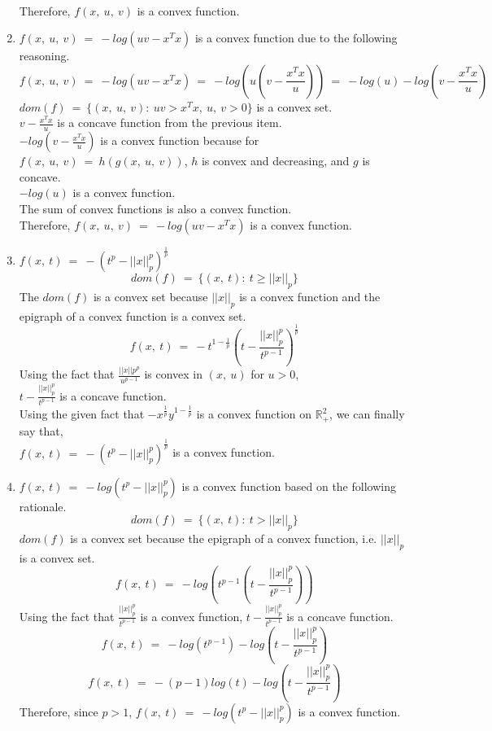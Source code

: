 \documentclass[12pt, draftcls, onecolumn]{IEEEtran}
\begin{document}
\begin{enumerate}
    \\Therefore, $f(x,\ u,\ v)$ is a convex function.
    \item $f(x,\ u,\ v)\ =\ -log(uv - x^Tx)$ is a convex function due to the following reasoning.
    \[f(x,\ u,\ v)\ =\ -log(uv - x^Tx)\ =\ -log(u(v-\frac{x^Tx}{u}))\ =\ -log(u) -log(v-\frac{x^Tx}{u})\]
    $dom(f)\ =\ \{(x,\ u,\ v):\ uv > x^Tx,\ u,\ v >0\}$ is a convex set.
    \\$v - \frac{x^Tx}{u}$ is a concave function from the previous item.
    \\$-log(v - \frac{x^Tx}{u})$ is a convex function because for $f(x,\ u,\ v)\ =\ h(g(x,\ u,\ v))$, $h$ is convex and decreasing, and $g$ is concave.
    \\$-log(u)$ is a convex function.
    \\The sum of convex functions is also a convex function.
    \\Therefore, $f(x,\ u,\ v)\ =\ -log(uv - x^Tx)$ is a convex function.
    \item $f(x,\ t)\ =\ -(t^p - ||x||_p^p)^{\frac{1}{p}}$
    \[dom(f)\ =\ \{(x,\ t):\ t \geq ||x||_p\}\]
    The $dom(f)$ is a convex set because $||x||_p$ is a convex function and the epigraph of a convex function is a convex set.
    \[f(x,\ t)\ =\ -t^{1-\frac{1}{p}}(t -\frac{||x||_p^p}{t^{p-1}})^{\frac{1}{p}}\]
    Using the fact that $\frac{||x||p^p}{u^{p-1}}$ is convex in $(x,\ u)$ for $u > 0$,
    \\$t -\frac{||x||_p^p}{t^{p-1}}$ is a concave function.
    \\Using the given fact that $-x^{\frac{1}{p}} y^{1-\frac{1}{p}}$ is a convex function on $\mathbb{R}^2_{+}$, we can finally say that,
    \\$f(x,\ t)\ =\ -(t^p - ||x||_p^p)^{\frac{1}{p}}$ is a convex function.
    \item $f(x,\ t)\ =\ -log(t^p - ||x||_p^p)$ is a convex function based on the following rationale.
    \[dom(f)\ =\ \{(x,\ t):\ t > ||x||_p\}\]
    $dom(f)$ is a convex set because the epigraph of a convex function, i.e. $||x||_p$ is a convex set.
    \[f(x,\ t)\ =\ -log(t^{p-1}(t - \frac{||x||_p^p}{t^{p-1}}))\]
    Using the fact that $\frac{||x||_p^p}{t^{p-1}}$ is a convex function,
    $t - \frac{||x||_p^p}{t^{p-1}}$ is a concave function.
    \[f(x,\ t)\ =\ -log(t^{p-1})-log(t - \frac{||x||_p^p}{t^{p-1}})\]
    \[f(x,\ t)\ =\ -(p-1)log(t)-log(t - \frac{||x||_p^p}{t^{p-1}})\]
    Therefore, since $p > 1$, $f(x,\ t)\ =\ -log(t^p - ||x||_p^p)$ is a convex function.
\end{enumerate}
\end{document}
